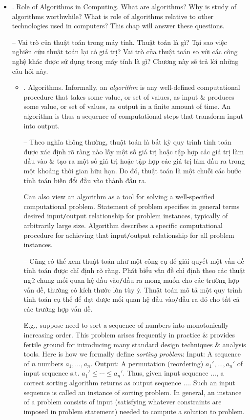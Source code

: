 \documentclass{article}
\begin{document}
\begin{itemize}
\begin{itemize}
\begin{enumerate}
		\end{enumerate}		
		\item {. Role of Algorithms in Computing.} What are algorithms? Why is study of algorithms worthwhile? What is role of algorithms relative to other technologies used in computers? This chap will answer these questions.
        
        -- {\sf Vai trò của thuật toán trong máy tính.} Thuật toán là gì? Tại sao việc nghiên cứu thuật toán lại có giá trị? Vai trò của thuật toán so với các công nghệ khác được sử dụng trong máy tính là gì? Chương này sẽ trả lời những câu hỏi này.
		\begin{itemize}
			\item {. Algorithms.} Informally, an {\it algorithm} is any well-defined computational procedure that takes some value, or set of values, as input \& produces some value, or set of values, as output in a finite amount of time. An algorithm is thus a sequence of computational steps that transform input into output.
			
			-- Theo nghĩa thông thường, thuật toán là bất kỳ quy trình tính toán được xác định rõ ràng nào lấy một số giá trị hoặc tập hợp các giá trị làm đầu vào \& tạo ra một số giá trị hoặc tập hợp các giá trị làm đầu ra trong một khoảng thời gian hữu hạn. Do đó, thuật toán là một chuỗi các bước tính toán biến đổi đầu vào thành đầu ra.
            
            Can also view an algorithm as a tool for solving a well-specified computational problem. Statement of problem specifies in general terms desired input{\tt/}output relationship for problem instances, typically of arbitrarily large size. Algorithm describes a specific computational procedure for achieving that input{\tt/}output relationship for all problem instances.
            
            -- Cũng có thể xem thuật toán như một công cụ để giải quyết một vấn đề tính toán được chỉ định rõ ràng. Phát biểu vấn đề chỉ định theo các thuật ngữ chung mối quan hệ đầu vào{\tt/}đầu ra mong muốn cho các trường hợp vấn đề, thường có kích thước lớn tùy ý. Thuật toán mô tả một quy trình tính toán cụ thể để đạt được mối quan hệ đầu vào{\tt/}đầu ra đó cho tất cả các trường hợp vấn đề.
            
            E.g., suppose need to sort a sequence of numbers into monotonically increasing order. This problem arises frequently in practice \& provides fertile ground for introducing many standard design techniques \& analysis tools. Here is how we formally define {\it sorting problem}: Input: A sequence of $n$ numbers $a_1,\ldots,a_n$. Output: A permutation (reordering) $a_1',\ldots,a_n'$ of input sequence s.t. $a_1'\le\cdots\le a_n'$. Thus, given input sequence $\ldots$, a correct sorting algorithm returns as output sequence $\ldots$. Such an input sequence is called an instance of sorting problem. In general, an instance of a problem consists of input (satisfying whatever constraints are imposed in problem statement) needed to compute a solution to problem.
            

\end{itemize}
\end{itemize}
\end{itemize}
\end{document}
